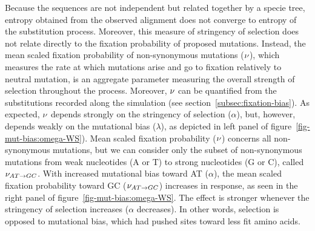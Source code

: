 
Because the sequences are not independent but related together by a specie tree, entropy obtained from the observed alignment does not converge to entropy of the substitution process.
Moreover, this measure of stringency of selection does not relate directly to the fixation probability of proposed mutations.
Instead, the mean scaled fixation probability of non-synonymous mutations ($\nu$), which measures the rate at which mutations arise and go to fixation relatively to neutral mutation, is an aggregate parameter measuring the overall strength of selection throughout the process.
Moreover, $\nu$ can be quantified from the substitutions recorded along the simulation (see section~\ref{subsec:fixation-bias}).
As expected, $\nu$ depends strongly on the stringency of selection ($\alpha$), but, however, depends weakly on the mutational bias ($\lambda$), as depicted in left panel of figure~\ref{fig-mut-bias:omega-WS}).
Mean scaled fixation probability ($\nu$) concerns all non-synonymous mutations, but we can consider only the subset of non-synonymous mutations from weak nucleotides (A or T) to strong nucleotides (G or C), called $\nu_{AT \rightarrow GC}$.
With increased mutational bias toward AT ($\alpha$), the mean scaled fixation probability toward GC ($\nu_{AT \rightarrow GC}$) increases in response, as seen in the right panel of figure~\ref{fig-mut-bias:omega-WS}.
The effect is stronger whenever the stringency of selection increases ($\alpha$ decreases).
In other words, selection is opposed to mutational bias, which had pushed sites toward less fit amino acids.

